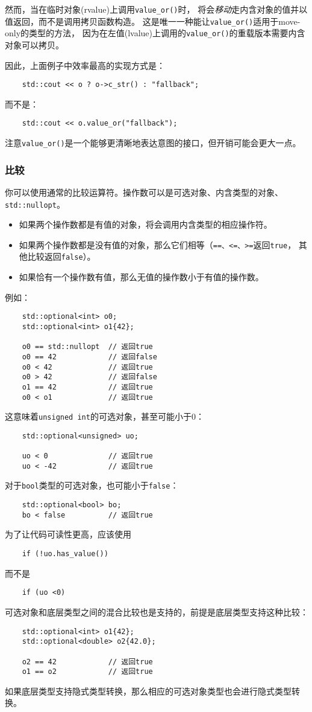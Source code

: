然而，当在临时对象(rvalue)上调用\texttt{value\_or()}时，
将会\emph{移动}走内含对象的值并以值返回，而不是调用拷贝函数构造。
这是唯一一种能让\texttt{value\_or()}适用于move-only的类型的方法，
因为在左值(lvalue)上调用的\texttt{value\_or()}的重载版本需要内含对象可以拷贝。

因此，上面例子中效率最高的实现方式是：
\begin{lstlisting}
    std::cout << o ? o->c_str() : "fallback";
\end{lstlisting}
而不是：
\begin{lstlisting}
    std::cout << o.value_or("fallback");
\end{lstlisting}
注意\texttt{value\_or()}是一个能够更清晰地表达意图的接口，但开销可能会更大一点。

\subsubsection{比较}
你可以使用通常的比较运算符。操作数可以是可选对象、内含类型的对象、\texttt{std::nullopt}。
\begin{itemize}
    \item 如果两个操作数都是有值的对象，将会调用内含类型的相应操作符。
    \item 如果两个操作数都是没有值的对象，那么它们相等（\texttt{==、<=、>=}返回\texttt{true}，
    其他比较返回\texttt{false}）。
    \item 如果恰有一个操作数有值，那么无值的操作数小于有值的操作数。
\end{itemize}
例如：
\begin{lstlisting}
    std::optional<int> o0;
    std::optional<int> o1{42};

    o0 == std::nullopt  // 返回true
    o0 == 42            // 返回false
    o0 < 42             // 返回true
    o0 > 42             // 返回false
    o1 == 42            // 返回true
    o0 < o1             // 返回true
\end{lstlisting}
这意味着\texttt{unsigned int}的可选对象，甚至可能小于0：
\begin{lstlisting}
    std::optional<unsigned> uo;

    uo < 0              // 返回true
    uo < -42            // 返回true
\end{lstlisting}
对于\texttt{bool}类型的可选对象，也可能小于\texttt{false}：
\begin{lstlisting}
    std::optional<bool> bo;
    bo < false          // 返回true
\end{lstlisting}
为了让代码可读性更高，应该使用
\begin{lstlisting}
    if (!uo.has_value())
\end{lstlisting}
而不是
\begin{lstlisting}
    if (uo <0)
\end{lstlisting}
可选对象和底层类型之间的混合比较也是支持的，前提是底层类型支持这种比较：
\begin{lstlisting}
    std::optional<int> o1{42};
    std::optional<double> o2{42.0};

    o2 == 42            // 返回true
    o1 == o2            // 返回true
\end{lstlisting}
如果底层类型支持隐式类型转换，那么相应的可选对象类型也会进行隐式类型转换。

